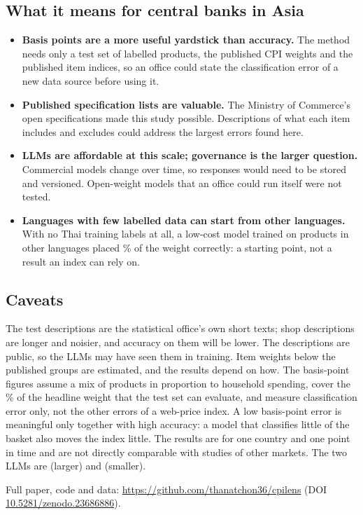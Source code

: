 \documentclass[11pt,a4paper]{article}
\begin{document}
\subsection*{What it means for central banks in Asia}

\begin{itemize}
\item \textbf{Basis points are a more useful yardstick than accuracy.} The method needs only a
test set of labelled products, the published CPI weights and the published item indices, so
an office could state the classification error of a new data source before using it.
\item \textbf{Published specification lists are valuable.} The Ministry of Commerce's open
specifications made this study possible. Descriptions of what each item includes and
excludes could address the largest errors found here.
\item \textbf{LLMs are affordable at this scale; governance is the larger question.}
Commercial models change over time, so responses would need to be stored and versioned.
Open-weight models that an office could run itself were not tested.
\item \textbf{Languages with few labelled data can start from other languages.} With no Thai
training labels at all, a low-cost model trained on products in other languages placed
\AccWEfiveMLPZeroShot\% of the weight correctly: a starting point, not a result an index can
rely on.
\end{itemize}

\subsection*{Caveats}

The test descriptions are the statistical office's own short texts; shop descriptions are
longer and noisier, and accuracy on them will be lower. The descriptions are public, so the
LLMs may have seen them in training. Item weights below the published groups are estimated,
and the results depend on how. The basis-point figures assume a mix of products in
proportion to household spending, cover the \RefWeightEqual\% of the headline weight that the
test set can evaluate, and measure classification error only, not the other errors of a
web-price index. A low basis-point error is meaningful only together with high accuracy: a
model that classifies little of the basket also moves the index little. The results are for
one country and one point in time and are not directly comparable with studies of other
markets. The two LLMs are \NameOpus{} (larger) and \NameHaiku{} (smaller).

\vspace{0.5em}
{\small\noindent Full paper, code and data:
\url{https://github.com/thanatchon36/cpilens} (DOI \href{https://doi.org/10.5281/zenodo.23686886}{10.5281/zenodo.23686886}).} %
\end{document}
